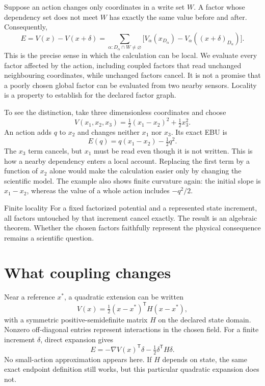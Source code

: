 Suppose an action changes only coordinates in a write set $W$. A factor whose dependency set does not meet $W$ has exactly the same value before and after. Consequently,
\begin{equation}\label{eq:factor-local}
 E=V(x)-V(x+\delta)
   =\sum_{\alpha:D_\alpha\cap W\ne\varnothing}
     \bigl[V_\alpha(x_{D_\alpha})-V_\alpha((x+\delta)_{D_\alpha})\bigr].
\end{equation}
This is the precise sense in which the calculation can be local. We evaluate every factor affected by the action, including coupled factors that read unchanged neighbouring coordinates, while unchanged factors cancel. It is not a promise that a poorly chosen global factor can be evaluated from two nearby sensors. Locality is a property to establish for the declared factor graph.

To see the distinction, take three dimensionless coordinates and choose
\begin{equation}
 V(x_1,x_2,x_3)=\tfrac12(x_1-x_2)^2+\tfrac12x_3^2.
\end{equation}
An action adds $q$ to $x_2$ and changes neither $x_1$ nor $x_3$. Its exact EBU is
\begin{equation}
 E(q)=q(x_1-x_2)-\tfrac12q^2.
\end{equation}
The $x_3$ term cancels, but $x_1$ must be read even though it is not written. This is how a nearby dependency enters a local account. Replacing the first term by a function of $x_2$ alone would make the calculation easier only by changing the scientific model. The example also shows finite curvature again: the initial slope is $x_1-x_2$, whereas the value of a whole action includes $-q^2/2$.

\begin{lawbox}{Finite locality}
For a fixed factorized potential and a represented state increment, all factors untouched by that increment cancel exactly. The result is an algebraic theorem. Whether the chosen factors faithfully represent the physical consequence remains a scientific question.
\end{lawbox}

\section{What coupling changes}
Near a reference $x^*$, a quadratic extension can be written
\begin{equation}
 V(x)=\tfrac12(x-x^*)^{\mathsf T}H(x-x^*),
\end{equation}
with a symmetric positive-semidefinite matrix $H$ on the declared state domain. Nonzero off-diagonal entries represent interactions in the chosen field. For a finite increment $\delta$, direct expansion gives
\begin{equation}\label{eq:coupled-finite}
 E=-\nabla V(x)^{\mathsf T}\delta-\tfrac12\delta^{\mathsf T}H\delta.
\end{equation}
No small-action approximation appears here. If $H$ depends on state, the same exact endpoint definition still works, but this particular quadratic expansion does not.

